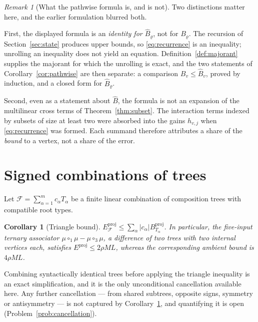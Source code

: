 \documentclass[11pt]{amsart}
\newtheorem{corollary}[theorem]{Corollary}
\theoremstyle{definition}
\theoremstyle{remark}
\newtheorem{remark}[theorem]{Remark}
\newcommand{\proj}{\mathrm{proj}}
\begin{document}
\begin{remark}[What the pathwise formula is, and is not]
\label{rem:pathwise}
Two distinctions matter here, and the earlier formulation blurred both.

First, the displayed formula is an \emph{identity for $\widehat B_\varrho$}, not for
$B_\varrho$. The recursion of Section~\ref{sec:state} produces upper bounds, so
\eqref{eq:recurrence} is an inequality; unrolling an inequality does not yield an equation.
Definition~\ref{def:majorant} supplies the majorant for which the unrolling is exact, and
the two statements of Corollary~\ref{cor:pathwise} are then separate: a comparison
$B_v\le\widehat B_v$, proved by induction, and a closed form for $\widehat B_\varrho$.

Second, even as a statement about $\widehat B$, the formula is not an expansion of the
multilinear cross terms of Theorem~\ref{thm:subset}. The interaction terms indexed by
subsets of size at least two were absorbed into the gains $h_{v,j}$ when
\eqref{eq:recurrence} was formed. Each summand therefore attributes a share of the
\emph{bound} to a vertex, not a share of the error.
\end{remark}

\section{Signed combinations of trees}
\label{sec:signed}

Let $\mathcal F=\sum_{\alpha=1}^{m}c_\alpha T_\alpha$ be a finite linear combination of
composition trees with compatible root types.

\begin{corollary}[Triangle bound]
\label{cor:signed}
$E_{\mathcal F}^{\proj}\le\sum_\alpha\lvert c_\alpha\rvert B_{T_\alpha}^{\proj}$. In
particular, the five-input ternary associator $\mu\circ_1\mu-\mu\circ_3\mu$, a difference
of two trees with two internal vertices each, satisfies $E^{\proj}\le2\rho ML$, whereas
the corresponding ambient bound is $4\rho ML$.
\end{corollary}

Combining syntactically identical trees before applying the triangle inequality is an
exact simplification, and it is the only unconditional cancellation available here. Any
further cancellation --- from shared subtrees, opposite signs, symmetry or antisymmetry
--- is not captured by Corollary~\ref{cor:signed}, and quantifying it is open
(Problem~\ref{prob:cancellation}).
\end{document}
